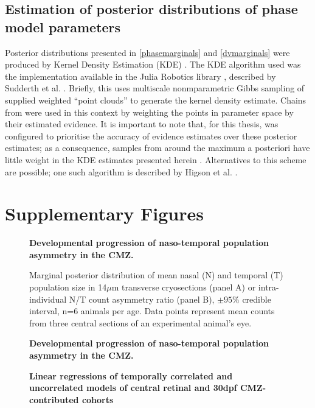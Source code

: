 \subsection{Estimation of posterior distributions of phase model parameters}
Posterior distributions presented in \autoref{phasemarginals} and \autoref{dvmarginals} were produced by Kernel Density Estimation (KDE) \cite[p. 122]{Bishop2006}. The KDE algorithm used was the implementation available in the Julia Robotics library , described by Sudderth et al. \cite{Sudderth2010}. Briefly, this uses multiscale nonmparametric Gibbs sampling of supplied weighted ``point clouds'' to generate the kernel density estimate. Chains from  were used in this context by weighting the points in parameter space by their estimated evidence. It is important to note that, for this thesis,  was configured to prioritise the accuracy of evidence estimates over these posterior estimates; as a consequence, samples from around the maximum a posteriori have little weight in the KDE estimates presented herein \cite{Higson2018}. Alternatives to this scheme are possible; one such algorithm is described by Higson et al. \cite{Higson2019}. 

\section{Supplementary Figures}

\begin{figure}[!h]
    \caption{{\bf Developmental progression of naso-temporal population asymmetry in the CMZ.}}
    \label{morphology}
\end{figure}

\begin{figure}[!h]
    \caption{{\bf Developmental progression of naso-temporal population asymmetry in the CMZ.}}
    Marginal posterior distribution of mean nasal (N) and temporal (T) population size in 14$\mu$m transverse cryosections (panel A) or intra-individual N/T count asymmetry ratio (panel B), $\pm 95\%$ credible interval, n=6 animals per age. Data points represent mean counts from three central sections of an experimental animal's eye. 
    \label{NTontology}
\end{figure}


\begin{figure}[!h]
    \caption{{\bf Linear regressions of temporally correlated and uncorrelated models of central retinal and 30dpf CMZ-contributed cohorts}}
    \label{a27linreg}
\end{figure}


